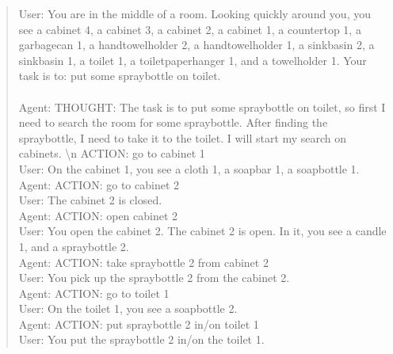 \begin{quote}\small\ttfamily
User: You are in the middle of a room. Looking quickly around you, you
see a cabinet 4, a cabinet 3, a cabinet 2, a cabinet 1, a countertop 1,
a garbagecan 1, a handtowelholder 2, a handtowelholder 1, a sinkbasin 2,
a sinkbasin 1, a toilet 1, a toiletpaperhanger 1, and a towelholder 1.
Your task is to: put some spraybottle on toilet.\\
\\
Agent: THOUGHT: The task is to put some spraybottle on toilet, so first
I need to search the room for some spraybottle. After finding the
spraybottle, I need to take it to the toilet. I will start my search on
cabinets. \textbackslash n ACTION: go to cabinet 1\\
User: On the cabinet 1, you see a cloth 1, a soapbar 1, a soapbottle 1.\\
Agent: ACTION: go to cabinet 2\\
User: The cabinet 2 is closed.\\
Agent: ACTION: open cabinet 2\\
User: You open the cabinet 2. The cabinet 2 is open. In it, you see a
candle 1, and a spraybottle 2.\\
Agent: ACTION: take spraybottle 2 from cabinet 2\\
User: You pick up the spraybottle 2 from the cabinet 2.\\
Agent: ACTION: go to toilet 1\\
User: On the toilet 1, you see a soapbottle 2.\\
Agent: ACTION: put spraybottle 2 in/on toilet 1\\
User: You put the spraybottle 2 in/on the toilet 1.
\end{quote}
